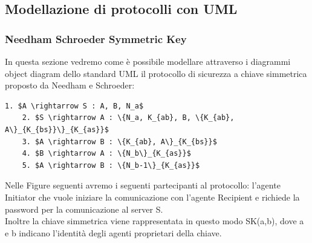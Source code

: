 \subsection{Modellazione di protocolli con UML}
\subsubsection*{Needham Schroeder Symmetric Key}
In questa sezione vedremo come è possibile modellare attraverso i diagrammi object diagram dello standard UML il protocollo di sicurezza a chiave simmetrica proposto da Needham e Schroeder:
\begin{lstlisting}[mathescape]
    1. $A \rightarrow S : A, B, N_a$
    2. $S \rightarrow A : \{N_a, K_{ab}, B, \{K_{ab}, A\}_{K_{bs}}\}_{K_{as}}$
    3. $A \rightarrow B : \{K_{ab}, A\}_{K_{bs}}$
    4. $B \rightarrow A : \{N_b\}_{K_{as}}$
    5. $A \rightarrow B : \{N_b-1\}_{K_{as}}$
\end{lstlisting} 

\noindent Nelle Figure seguenti avremo i seguenti partecipanti al protocollo: l'agente Initiator che vuole iniziare la comunicazione con l'agente Recipient e richiede la password per la comunicazione al server S.\\
Inoltre la chiave simmetrica viene rappresentata in questo modo SK(a,b), dove a e b indicano l'identità degli agenti proprietari della chiave.\\

